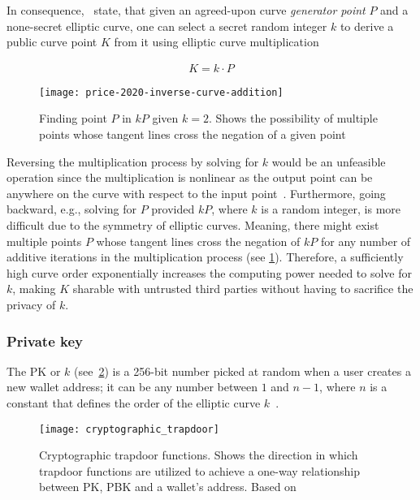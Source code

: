 In consequence,~\textcites[65,68]{antonopoulos_mastering_2017}[5]{kapoor_elliptic_2008} state, that given an agreed-upon curve \emph{generator point} $P$ and a none-secret elliptic curve, one can select a secret random integer $k$ to derive a public curve point $K$ from it using elliptic curve multiplication

\begin{align}\label{eq:curve-multiplication}
    K=k \cdot P
\end{align}

\begin{figure}[H]
    \begin{center}
        \texttt{[image: price-2020-inverse-curve-addition]}
    \end{center}
    \caption[Finding point $P$ in $kP$ given $k=2$]{Finding point $P$ in $kP$ given $k=2$.
    Shows the possibility of multiple points whose tangent lines cross the negation of a given point~\autocite{price_bitcoins_2020}}
    \label{fig:finding-point-p}
\end{figure}

Reversing the multiplication process by solving for $k$ would be an unfeasible operation since the multiplication is nonlinear as the output point can be anywhere on the curve with respect to the input point~\autocite{price_bitcoins_2020}.
Furthermore, going backward, e.g., solving for $P$ provided $kP$, where $k$ is a random integer, is more difficult due to the symmetry of elliptic curves.
Meaning, there might exist multiple points $P$ whose tangent lines cross the negation of $kP$ for any number of additive iterations in the multiplication process (see \cref{fig:finding-point-p}).
Therefore, a sufficiently high curve order exponentially increases the computing power needed to solve for $k$, making $K$ sharable with untrusted third parties without having to sacrifice the privacy of $k$.

\subsubsection{Private key}\label{subsubsec:private-key}

The \gls{PK} or $k$ (see~\cref{fig:elliptic-curve-trapdoor}) is a 256-bit number picked at random when a user creates a new wallet address;
it can be any number between $1$ and $n-1$, where $n$ is a constant that defines the order of the elliptic curve $k$~\autocite[63]{antonopoulos_mastering_2017}.

\begin{figure}[H]
    \texttt{[image: cryptographic\_trapdoor]}
    \caption[Cryptographic trapdoor functions]{Cryptographic trapdoor functions. Shows the direction in which trapdoor functions are utilized to achieve a one-way relationship between \gls{PK}, \gls{PBK} and a wallet's address. Based on~\textcite[160]{antonopoulos_mastering_2017}}
    \label{fig:elliptic-curve-trapdoor}
\end{figure}

